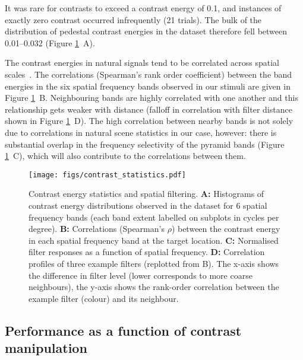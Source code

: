 \documentclass[11pt,a4paper]{article}
\begin{document}
It was rare for contrasts to exceed a contrast energy of 0.1, and instances of exactly zero contrast occurred infrequently (21 trials).
The bulk of the distribution of pedestal contrast energies in the dataset therefore fell between 0.01--0.032 (Figure \ref{fig:contrast_stats}~A).

The contrast energies in natural signals tend to be correlated across spatial scales~\citep{Field1987,Simo97,ZeBaWe93a,Balboa2000,Mante2005}.
The correlations (Spearman's rank order coefficient) between the band energies in the six spatial frequency bands observed in our stimuli are given in Figure \ref{fig:contrast_stats}~B.
Neighbouring bands are highly correlated with one another and this relationship gets weaker with distance (falloff in correlation with filter distance shown in Figure \ref{fig:contrast_stats}~D).
The high correlation between nearby bands is not solely due to correlations in natural scene statistics in our case, however: there is substantial overlap in the frequency selectivity of the pyramid bands (Figure \ref{fig:contrast_stats}~C), which will also contribute to the correlations between them.


\begin{figure}[H]
\centering
\texttt{[image: figs/contrast\_statistics.pdf]}
\caption{
Contrast energy statistics and spatial filtering.
\textbf{A:} Histograms of contrast energy distributions observed in the dataset for 6 spatial frequency bands (each band extent labelled on subplots in cycles per degree).
\textbf{B:} Correlations (Spearman's $\rho$) between the contrast energy in each spatial frequency band at the target location.
\textbf{C:} Normalised filter responses as a function of spatial frequency.
\textbf{D:} Correlation profiles of three example filters (replotted from B). 
The x-axis shows the difference in filter level (lower corresponds to more coarse neighbours), the y-axis shows the rank-order correlation between the example filter (colour) and its neighbour.
}
\label{fig:contrast_stats}
\end{figure}



\subsection{Performance as a function of contrast manipulation}
\end{document}
